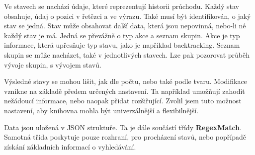 Ve stavech se nachází údaje, které reprezentují historii průchodu.
Každý stav obsahuje, údaj o pozici v řetězci a ve výrazu. 
Také musí být identifikován, o jaký stav se jedná.
Stav může obsahovat další data, která jsou nepovinná, nebo-li né každý stav je má.
Jedná se převážně o typ akce a seznam skupin.
Akce je typ informace, která upřesňuje typ stavu, jako je například backtracking.
Seznam skupin se může nacházet, také v jednotlivých stavech.
Lze pak pozorovat průběh vývoje skupin, s vývojem stavů.

Výsledné stavy se mohou lišit, jak dle počtu, nebo také podle tvaru. 
Modifikace vznikne na základě předem určených nastavení.
Ta například umožňují zahodit nežádoucí informace, nebo naopak přidat rozšiřující.
Zvolil jsem tuto možnost nastavení, aby knihovna mohla být univerzálnější a flexibilnější.

Data jsou uložená v JSON struktuře.
Ta je dále součástí třídy \textbf{RegexMatch}.
Samotná třída poskytuje pouze rozhraní, pro procházení stavů, nebo popřípadě získání základních informací o vyhledávání.

\endinput